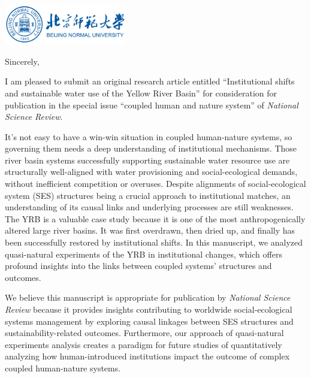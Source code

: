 \documentclass[11pt,a4paper,roman]{moderncv}
\begin{document}
\begin{minipage}[t]{\textwidth}
\includegraphics[width=0.40\textwidth]{bnu}
\end{minipage}


\opening{\vspace*{-2em}}
\closing{Sincerely,}{\vspace*{-2em}}
\makelettertitle

I am pleased to submit an original research article entitled ``Institutional shifts and sustainable water use of the Yellow River Basin'' for consideration for publication in the special issue ``coupled human and nature system'' of \textit{National Science Review}.

It's not easy to have a win-win situation in coupled human-nature systems, so governing them needs a deep understanding of institutional mechanisms. Those river basin systems successfully supporting sustainable water resource use are structurally well-aligned with water provisioning and social-ecological demands, without inefficient competition or overuses. Despite alignments of social-ecological system (SES) structures being a crucial approach to institutional matches, an understanding of its causal links and underlying processes are still weaknesses. The YRB is a valuable case study because it is one of the most anthropogenically altered large river basins. It was first overdrawn, then dried up, and finally has been successfully restored by institutional shifts. In this manuscript, we analyzed quasi-natural experiments of the YRB in institutional changes, which offers profound insights into the links between coupled systems' structures and outcomes.

We believe this manuscript is appropriate for publication by \textit{National Science Review} because it provides insights contributing to worldwide social-ecological systems management by exploring causal linkages between SES structures and sustainability-related outcomes. Furthermore, our approach of quasi-natural experiments analysis creates a paradigm for future studies of quantitatively analyzing how human-introduced institutions impact the outcome of complex coupled human-nature systems.
\end{document}
